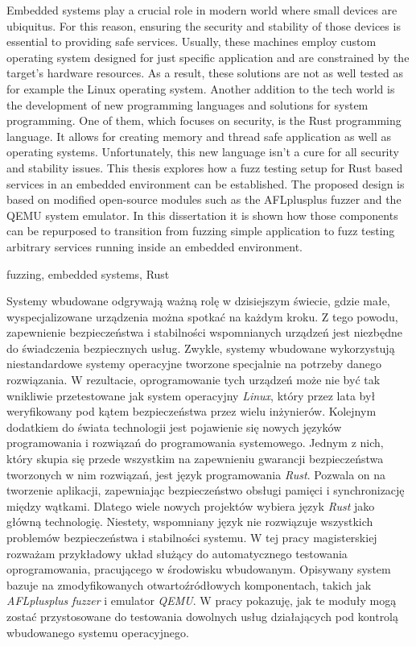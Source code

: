 \documentclass[
    bindingoffset=5mm,  %
    footnoteindent=3mm, %
    hyphenation=true    %
]{src/wut-thesis}
\begin{document}
Embedded systems play a crucial role in modern world where small devices
are ubiquitus. For this reason, ensuring the security and stability of those
devices is essential to providing safe services. Usually, these machines employ custom operating system designed for just speciﬁc application and are constrained by the target’s hardware resources. As a result, these solutions are not as well tested as for example the Linux operating system.
Another addition to the tech world is the development of new programming languages
and solutions for system programming. One of them, which focuses on security, is the
Rust programming language. It allows for creating memory and thread safe application
as well as operating systems. Unfortunately, this new language isn’t a cure for all security and stability
issues. This thesis explores how a fuzz testing setup for Rust based services in an embedded environment can be established. The proposed design is based on modiﬁed open-source modules
such as the AFLplusplus fuzzer and the QEMU system emulator. In this dissertation it
is shown how those components can be repurposed to transition from fuzzing simple
application to fuzz testing arbitrary services running inside an embedded environment.

\keywords fuzzing, embedded systems, Rust

\clearpage
\secondabstract
Systemy wbudowane odgrywają ważną rolę w dzisiejszym świecie, gdzie małe, wyspecjalizowane urządzenia można spotkać na każdym kroku. Z tego powodu, zapewnienie bezpieczeństwa i stabilności wspomnianych urządzeń jest niezbędne do świa\-dczenia bezpiecznych usług. Zwykle, systemy wbudowane wykorzystują niestandardo\-we systemy operacyjne tworzone specjalnie na potrzeby danego rozwiązania. W rezultacie, oprogramowanie tych urządzeń może nie być tak wnikliwie przetestowane jak system operacyjny \textit{Linux}, który przez lata był weryfikowany pod kątem bezpieczeństwa przez wielu inżynierów. Kolejnym dodatkiem do świata technologii jest pojawienie się nowych języków programowania i rozwiązań do programowania systemowego. Jednym z nich, który skupia się przede wszystkim na zapewnieniu gwarancji bezpieczeństwa tworzonych w nim rozwiązań, jest język programowania \textit{Rust}. Pozwala on na tworzenie aplikacji, zapewniając bezpieczeństwo obsługi pamięci i synchronizację między wątkami. Dlatego wiele nowych projektów wybiera język \textit{Rust} jako główną technologię. Niestety, wspomniany język nie rozwiązuje wszystkich problemów bezpieczeństwa i stabilności systemu. W tej pracy magisterskiej rozważam przykładowy układ służący do automatycznego testowania oprogramowania, pracującego w środowisku wbudowanym. Opisywany system bazuje na zmodyfikowanych otwartoźródłowych komponentach, takich jak \textit{AFLplusplus} \textit{fuzzer} i emu\-lator \textit{QEMU}. W pracy pokazuję, jak te moduły mogą zostać przystosowane do testowania dowolnych usług działających pod kontrolą wbudowanego systemu operacyjnego.
\end{document}
